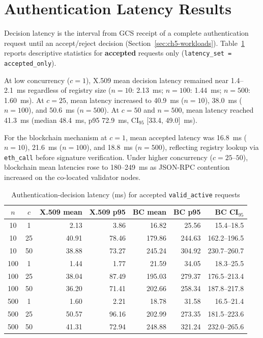 
\section{Authentication Latency Results}
\label{sec:ch5-latency}

Decision latency is the interval from GCS receipt of a complete authentication request until an accept/reject decision (Section~\ref{sec:ch5-workloads}). Table~\ref{tab:ch5-latency} reports descriptive statistics for \textbf{accepted} requests only (\texttt{latency\_set = accepted\_only}).

At low concurrency ($c=1$), X.509 mean decision latency remained near 1.4--2.1~ms regardless of registry size ($n=10$: 2.13~ms; $n=100$: 1.44~ms; $n=500$: 1.60~ms). At $c=25$, mean latency increased to 40.9~ms ($n=10$), 38.0~ms ($n=100$), and 50.6~ms ($n=500$). At $c=50$ and $n=500$, mean latency reached 41.3~ms (median 48.4~ms, p95 72.9~ms, CI$_{95}$ [33.4, 49.0]~ms).

For the blockchain mechanism at $c=1$, mean accepted latency was 16.8~ms ($n=10$), 21.6~ms ($n=100$), and 18.8~ms ($n=500$), reflecting registry lookup via \texttt{eth\_call} before signature verification. Under higher concurrency ($c=25$--$50$), blockchain mean latencies rose to 180--249~ms as JSON-RPC contention increased on the co-located validator nodes.

\begin{table}[htbp]
    \centering
    \caption{Authentication-decision latency (ms) for accepted \texttt{valid\_active} requests}
    \label{tab:ch5-latency}
    \small
    \begin{tabular}{|c|c|r|r|r|r|r|}
        \hline
        \textbf{$n$} & \textbf{$c$} & \textbf{X.509 mean} & \textbf{X.509 p95} & \textbf{BC mean} & \textbf{BC p95} & \textbf{BC CI$_{95}$} \\
        \hline
        10  & 1  & 2.13 & 3.86 & 16.82 & 25.56 & 15.4--18.5 \\
        10  & 25 & 40.91 & 78.46 & 179.86 & 244.63 & 162.2--196.5 \\
        10  & 50 & 38.88 & 73.27 & 245.24 & 304.92 & 230.7--260.7 \\
        100 & 1  & 1.44 & 1.77 & 21.59 & 34.05 & 18.3--25.5 \\
        100 & 25 & 38.04 & 87.49 & 195.03 & 279.37 & 176.5--213.4 \\
        100 & 50 & 36.20 & 71.41 & 202.66 & 258.34 & 187.8--217.8 \\
        500 & 1  & 1.60 & 2.21 & 18.78 & 31.58 & 16.5--21.4 \\
        500 & 25 & 50.57 & 96.16 & 202.99 & 273.35 & 181.5--223.6 \\
        500 & 50 & 41.31 & 72.94 & 248.88 & 321.24 & 232.0--265.6 \\
        \hline
    \end{tabular}
\end{table}

